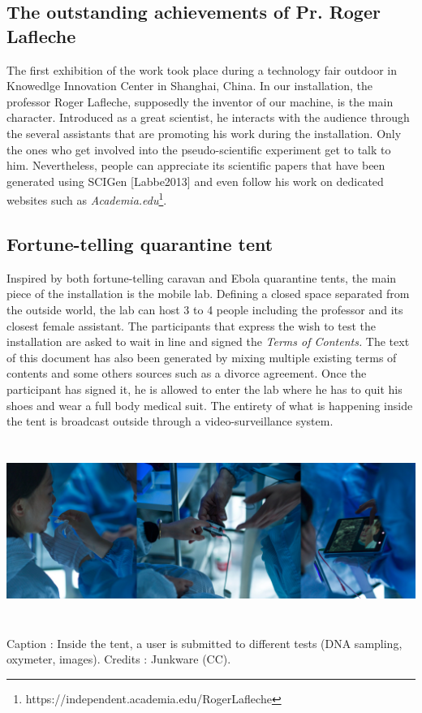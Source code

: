 \subsection{The outstanding achievements of Pr. Roger Lafleche}
The first exhibition of the work took place during a technology fair
outdoor in Knowedlge Innovation Center in Shanghai, China. In our
installation, the professor Roger Lafleche, supposedly the inventor of
our machine, is the main character. Introduced as a great scientist, he
interacts with the audience through the several assistants that are
promoting his work during the installation. Only the ones who get
involved into the pseudo-scientific experiment get to talk to him.
Nevertheless, people can appreciate its scientific papers that have
been generated using SCIGen [Labbe2013] and even follow his work on
dedicated websites such as
\textit{A}\textit{cademia.edu}\footnote{https://independent.academia.edu/RogerLafleche}.


\subsection{Fortune-telling quarantine tent}
Inspired by both fortune-telling caravan and Ebola quarantine tents, the
main piece of the installation is the mobile lab. Defining a closed
space separated from the outside world, the lab can host 3 to 4 people
including the professor and its closest female assistant. The
participants that express the wish to test the installation are asked
to wait in line and signed the \textit{Terms of Contents. }The text of
this document has also been generated by mixing multiple existing terms
of contents and some others sources such as a divorce agreement. Once
the participant has signed it, he is allowed to enter the lab where he
has to quit his shoes and wear a full body medical suit. The entirety
of what is happening inside the tent is broadcast outside through a
video-surveillance system.


\bigskip



\begin{center}
\includegraphics[width=6.9252in,height=2.3055in]{images/junkware-img4.jpg}
\end{center}
{\centering
Caption : Inside the tent, a user is submitted to different tests (DNA
sampling, oxymeter, images). Credits : Junkware (CC).
\par}


